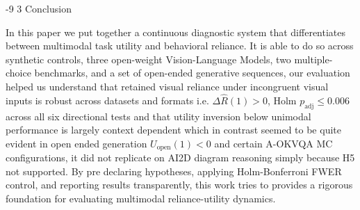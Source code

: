 \documentclass[graybox]{svmult}
\makeatletter
\renewcommand\section{\@startsection{section}{1}{\z@}%
  {-9\p@ \@plus -2\p@ \@minus -1\p@}%
  {3\p@ \@plus 1\p@ \@minus 1\p@}%
  {\normalfont\large\bfseries\boldmath}}
\makeatother
\begin{document}
\section{Conclusion}
\label{sec:conclusion}

In this paper we put together a continuous diagnostic system that differentiates between multimodal task utility and behavioral reliance. It is able to do so across synthetic controls, three open-weight Vision-Language Models, two multiple-choice benchmarks, and a set of open-ended generative sequences, our evaluation helped us understand that retained visual reliance under incongruent visual inputs is robust across datasets and formats i.e. $\Delta\hat{R}(1) > 0$, Holm $p_{\text{adj}} \le 0.006$ across all six directional tests and that utility inversion below unimodal performance is largely context dependent which in contrast seemed to be quite evident in open ended generation $U_{\text{open}}(1) < 0$ and certain A-OKVQA MC configurations, it did not replicate on AI2D diagram reasoning simply because H5 not supported. By pre declaring hypotheses, applying Holm-Bonferroni FWER control, and reporting results transparently, this work tries to provides a rigorous foundation for evaluating multimodal reliance-utility dynamics.
\end{document}
